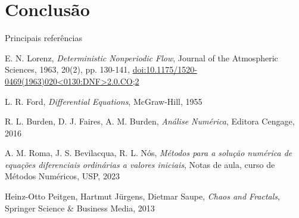 \section{Conclusão}

\begin{frame}{Principais referências}
    \footnotesize
    \begin{thebibliography}{99}
            E. N. Lorenz,
            \textit{Deterministic Nonperiodic Flow},
            Journal of the Atmospheric Sciences,
            1963, 20(2), pp. 130-141,
            \href{https://doi.org/10.1175/1520-0469(1963)020<0130:DNF>2.0.CO;2}{doi:10.1175/1520-0469(1963)020<0130:DNF>2.0.CO;2}
            
            L. R. Ford,
            \textit{Differential Equations},
            McGraw-Hill,
            1955
            
            R. L. Burden, D. J. Faires, A. M. Burden,
            \textit{Análise Numérica},
            Editora Cengage,
            2016
            
            A. M. Roma, J. S. Bevilacqua, R. L. Nós,
            \textit{Métodos para a solução numérica de equações diferenciais ordinárias a valores iniciais},
            Notas de aula, curso de Métodos Numéricos, USP,
            2023
            
            Heinz-Otto Peitgen, Hartmut J{\"u}rgens, Dietmar Saupe,
            \textit{Chaos and Fractals},
            Springer Science \& Business Media,
            2013
            
    \end{thebibliography}
\end{frame}



